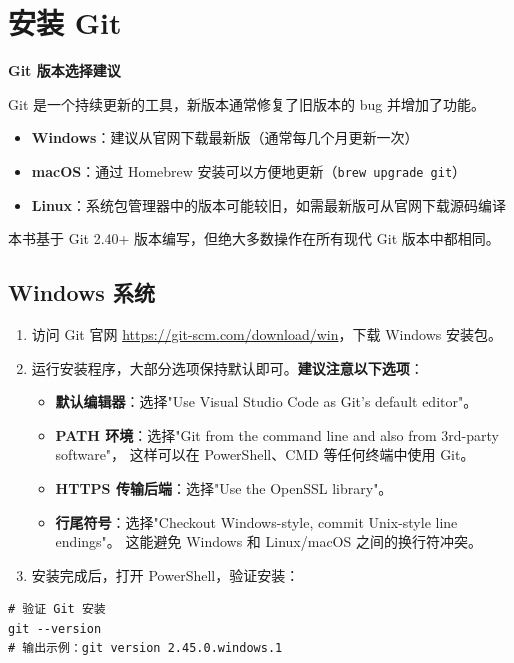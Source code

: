 \documentclass[12pt,a4paper,openany]{ctexbook}
\begin{document}
\section{安装 Git}

\medskip
\textbf{Git 版本选择建议}

Git 是一个持续更新的工具，新版本通常修复了旧版本的 bug 并增加了功能。
\begin{itemize}
  \item \textbf{Windows}：建议从官网下载最新版（通常每几个月更新一次）
  \item \textbf{macOS}：通过 Homebrew 安装可以方便地更新（\texttt{brew upgrade git}）
  \item \textbf{Linux}：系统包管理器中的版本可能较旧，如需最新版可从官网下载源码编译
\end{itemize}

本书基于 Git 2.40+ 版本编写，但绝大多数操作在所有现代 Git 版本中都相同。
\medskip

\subsection{Windows 系统}

\medskip
\begin{enumerate}[leftmargin=1.5em]
  \item 访问 Git 官网 \url{https://git-scm.com/download/win}，下载 Windows 安装包。
  \item 运行安装程序，大部分选项保持默认即可。\textbf{建议注意以下选项}：
  \begin{itemize}
    \item \textbf{默认编辑器}：选择"Use Visual Studio Code as Git's default editor"。
    \item \textbf{PATH 环境}：选择"Git from the command line and also from 3rd-party software"，
          这样可以在 PowerShell、CMD 等任何终端中使用 Git。
    \item \textbf{HTTPS 传输后端}：选择"Use the OpenSSL library"。
    \item \textbf{行尾符号}：选择"Checkout Windows-style, commit Unix-style line endings"。
          这能避免 Windows 和 Linux/macOS 之间的换行符冲突。
  \end{itemize}
  \item 安装完成后，打开 PowerShell，验证安装：
\end{enumerate}
\medskip

\begin{lstlisting}[style=shell]
# 验证 Git 安装
git --version
# 输出示例：git version 2.45.0.windows.1
\end{lstlisting}
\end{document}
